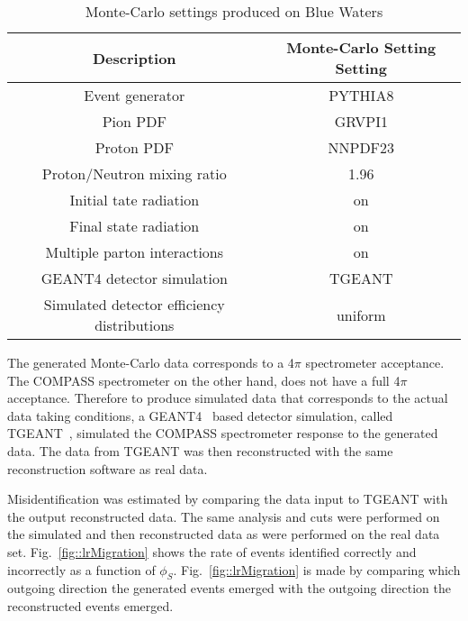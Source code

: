 \begin{table}[h!t]
  \centering
  \caption{Monte-Carlo settings produced on Blue Waters}
  \label{tab::MCproduction}
  \begin{tabular}{ |c|c| }
    \hline
    \textbf{Description}& \textbf{Monte-Carlo Setting Setting} \\ \hline
    \hline
    Event generator& PYTHIA8\\
    \hline

    Pion PDF& GRVPI1\\
    \hline

    Proton PDF& NNPDF23\\
    \hline
    
    Proton/Neutron mixing ratio& 1.96\\
    \hline

    Initial tate radiation& on\\
    \hline
    
    Final state radiation& on\\
    \hline
    
    Multiple parton interactions& on\\
    \hline

    GEANT4 detector simulation& TGEANT \\
    \hline

    Simulated detector efficiency distributions& uniform\\
    \hline
    
  \end{tabular}
\end{table}

The generated Monte-Carlo data corresponds to a 4$\pi$ spectrometer acceptance.
The COMPASS spectrometer on the other hand, does not have a full 4$\pi$
acceptance.  Therefore to produce simulated data that corresponds to the actual
data taking conditions, a GEANT4~\cite{AGOSTINELLI2003250} based detector
simulation, called TGEANT~\cite{TGEANTthesis}, simulated the COMPASS
spectrometer response to the generated data.  The data from TGEANT was then
reconstructed with the same reconstruction software as real data.

Misidentification was estimated by comparing the data input to TGEANT with the
output reconstructed data.  The same analysis and cuts were performed on the
simulated and then reconstructed data as were performed on the real data set.
Fig.~\ref{fig::lrMigration} shows the rate of events identified correctly and
incorrectly as a function of $\phi_S$.  Fig.~\ref{fig::lrMigration} is made by
comparing which outgoing direction the generated events emerged with the
outgoing direction the reconstructed events emerged.

